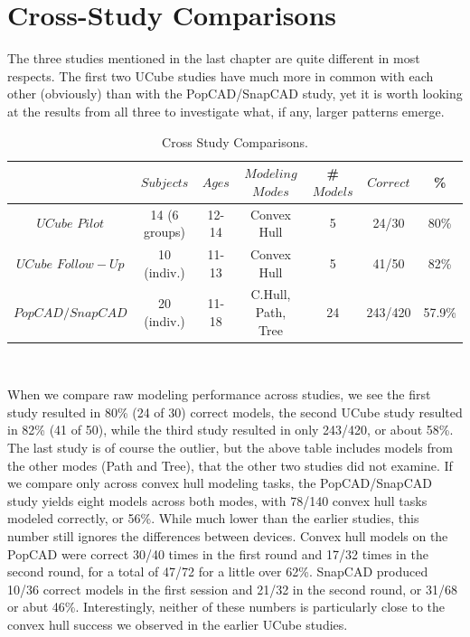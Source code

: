 \section{Cross-Study Comparisons}

The three studies mentioned in the last chapter are quite different in most
respects. The first two UCube studies have much more in common with each other
(obviously) than with the PopCAD/SnapCAD study, yet it is worth looking at the
results from all three to investigate what, if any, larger patterns emerge.


\begin{table}[!ht] 
\small
    \caption[Cross Study Comparisons]{Cross Study Comparisons.}
    \begin{center}
    \begin{tabular}{| c | c | c | c | c | c | c |}
    \hline $ $ & $Subjects$ & $Ages$ & $Modeling$ $Modes$ & \#
    $Models$ & $Correct$ & \% \\ \hline 
    $UCube$ $Pilot$  & 14 (6 groups) & 12-14 & Convex Hull & 5 & 24/30 & 80\% \\
    \hline 
    $UCube$ $Follow-Up$  & 10 (indiv.) & 11-13 & Convex Hull & 5 & 41/50 & 82\% \\ \hline 
    $PopCAD/SnapCAD$  & 20 (indiv.) & 11-18 & C.Hull, Path, Tree & 24 & 243/420
    & 57.9\%
    \\
    \hline

	\end{tabular}
   \\ \rule{0mm}{5mm}
\end{center}
\label{crossStudy}
\end{table}


When we compare raw modeling performance across studies, we see the first study
resulted in 80\% (24 of 30) correct models, the second UCube study resulted in
82\% (41 of 50), while the third study resulted in only 243/420, or about 58\%.
The last study is of course the outlier, but the above table includes models
from the other modes (Path and Tree), that the other two studies did not
examine. If we compare only across convex hull modeling tasks, the
PopCAD/SnapCAD study yields eight models across both modes, with 78/140 convex
hull tasks modeled correctly, or 56\%. While much lower than the earlier studies,
this number still ignores the differences between devices. Convex hull models
on the PopCAD were correct 30/40 times in the first round and 17/32 times in the
second round, for a total of 47/72 for a little over 62\%. SnapCAD produced
10/36 correct models in the first session and 21/32 in the second round, or
31/68 or abut 46\%. Interestingly, neither of these numbers is particularly
close to the convex hull success we observed in the earlier UCube studies.

